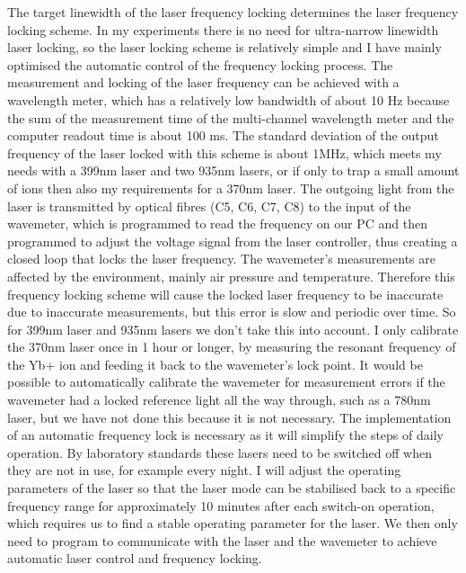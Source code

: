 The target linewidth of the laser frequency locking determines the laser frequency locking scheme. In my experiments there is no need for ultra-narrow linewidth laser locking, so the laser locking scheme is relatively simple and I have mainly optimised the automatic control of the frequency locking process. The measurement and locking of the laser frequency can be achieved with a wavelength meter, which has a relatively low bandwidth of about 10 Hz because the sum of the measurement time of the multi-channel wavelength meter and the computer readout time is about 100 ms. The standard deviation of the output frequency of the laser locked with this scheme is about 1MHz, which meets my needs with a 399nm laser and two 935nm lasers, or if only to trap a small amount of ions then also my requirements for a 370nm laser. The outgoing light from the laser is transmitted by optical fibres (C5, C6, C7, C8) to the input of the wavemeter, which is programmed to read the frequency on our PC and then programmed to adjust the voltage signal from the laser controller, thus creating a closed loop that locks the laser frequency. The wavemeter's measurements are affected by the environment, mainly air pressure and temperature. Therefore this frequency locking scheme will cause the locked laser frequency to be inaccurate due to inaccurate measurements, but this error is slow and periodic over time. So for 399nm laser and 935nm lasers we don't take this into account. I only calibrate the 370nm laser once in 1 hour or longer, by measuring the resonant frequency of the Yb+ ion and feeding it back to the wavemeter's lock point. It would be possible to automatically calibrate the wavemeter for measurement errors if the wavemeter had a locked reference light all the way through, such as a 780nm laser, but we have not done this because it is not necessary. The implementation of an automatic frequency lock is necessary as it will simplify the steps of daily operation. By laboratory standards these lasers need to be switched off when they are not in use, for example every night. I will adjust the operating parameters of the laser so that the laser mode can be stabilised back to a specific frequency range for approximately 10 minutes after each switch-on operation, which requires us to find a stable operating parameter for the laser. We then only need to program to communicate with the laser and the wavemeter to achieve automatic laser control and frequency locking.

